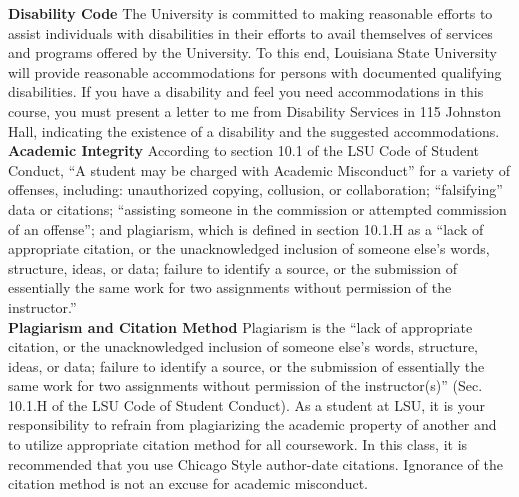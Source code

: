 \documentclass[11pt,article,oneside]{memoir}
\begin{document}
\clearpage

\noindent \textbf{Disability Code}
The University is committed to making reasonable efforts to assist individuals with disabilities in
their efforts to avail themselves of services and programs offered by the University. To this end,
Louisiana State University will provide reasonable accommodations for persons with
documented qualifying disabilities. If you have a disability and feel you need accommodations in
this course, you must present a letter to me from Disability Services in 115 Johnston Hall,
indicating the existence of a disability and the suggested accommodations.\\

\noindent \textbf{Academic Integrity}
According to section 10.1 of the LSU Code of Student Conduct, ``A student may be charged with Academic Misconduct'' for a variety of offenses, including: unauthorized copying, collusion, or collaboration; ``falsifying'' data or citations; ``assisting someone in the commission or attempted commission of an offense''; and plagiarism, which is defined in section 10.1.H as a ``lack of appropriate citation, or the unacknowledged inclusion of someone else's words, structure, ideas, or data; failure to identify a source, or the submission of essentially the same work for two assignments without permission of the instructor.''\\

\noindent \textbf{Plagiarism and Citation Method}
Plagiarism is the ``lack of appropriate citation, or the unacknowledged inclusion of someone else's words, structure, ideas, or data; failure to identify a source, or the submission of essentially the same work for two assignments without permission of the instructor(s)'' (Sec. 10.1.H of the LSU Code of Student Conduct). As a student at LSU, it is your responsibility to refrain from plagiarizing the academic property of another and to utilize appropriate citation method for all coursework. In this class, it is recommended that you use Chicago Style author-date citations. Ignorance of the citation method is not an excuse for academic misconduct.
\end{document}
